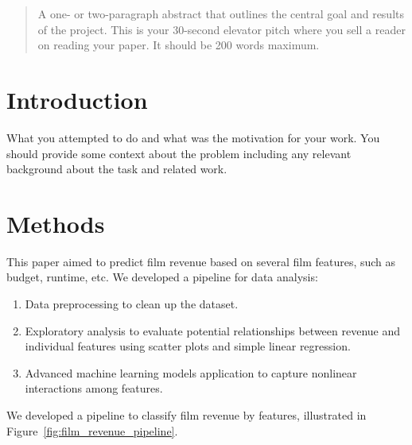\documentclass{article}
\begin{document}

\begin{abstract}
A one- or two-paragraph abstract that outlines the central goal and
  results of the project.  This is your 30-second elevator pitch where you
  sell a reader on reading your paper.  It should be 200 words maximum.
\end{abstract}

\section{Introduction}
\label{introduction}

What you attempted to do and what
  was the motivation for your work. You should provide some context about the problem
  including any relevant background about the task and related work.

\section{Methods}
\label{methods}
This paper aimed to predict film revenue based on several film features, such as budget, runtime, etc. We developed a pipeline for data analysis:
\begin{enumerate}
    \item Data preprocessing to clean up the dataset.
    \item Exploratory analysis to evaluate potential relationships between revenue and individual features using scatter plots and simple linear regression.
    \item Advanced machine learning models application to capture nonlinear interactions among features.
\end{enumerate}

We developed a pipeline to classify film revenue by features, illustrated in Figure~\ref{fig:film_revenue_pipeline}.
\end{document}
